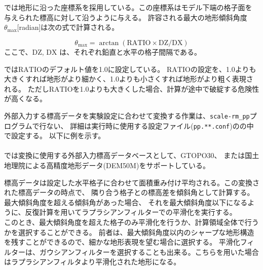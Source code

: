 \section{\SecBasicTopoSetting} \label{subsec:basic_usel_topo}

\scalerm では地形に沿った座標系を採用している。この座標系はモデル下端の格子面を
与えられた標高に対して沿うように与える。
許容される最大の地形傾斜角度$\theta_{\max}$[radian]は次の式で計算される。

\[ \theta_{\max} = \arctan( \mathrm{RATIO} \times \mathrm{DZ}/\mathrm{DX} ) \]
ここで、$\mathrm{DZ}$, $\mathrm{DX}$ は、それぞれ鉛直と水平の格子間隔である。

\scalerm では$\mathrm{RATIO}$のデフォルト値を1.0に設定している。
$\mathrm{RATIO}$の設定を、1.0よりも大きくすれば地形がより細かく、1.0よりも小さくすれば地形がより粗く表現される。
ただし$\mathrm{RATIO}$を1.0よりも大きくした場合、計算が途中で破綻する危険性が高くなる。

外部入力する標高データを実験設定に合わせて変換する作業は、\verb|scale-rm_pp|プログラムで行ない、
詳細は実行時に使用する設定ファイル(\verb|pp.**.conf|)のの中で設定する。
以下に例を示す。\\

\\

\scalerm では変換に使用する外部入力標高データベースとして、GTOPO30、
または国土地理院による高精度地形データ(DEM50M)をサポートしている。


標高データは設定した水平格子に合わせて面積重み付け平均される。この変換された標高データの時点で、
隣り合う格子との標高差を傾斜角として計算する。最大傾斜角度を超える傾斜角があった場合、
それを最大傾斜角度以下になるように、反復計算を用いてラプラシアンフィルターでの平滑化を実行する。\\
このとき、最大傾斜角度を超えた格子のみ平滑化を行うか、計算領域全体で行うかを選択することができる。
前者は、最大傾斜角度以内のシャープな地形構造を残すことができるので、細かな地形表現を望む場合に選択する。
平滑化フィルターは、ガウシアンフィルターを選択することも出来る。こちらを用いた場合はラプラシアンフィルタより平滑化された地形になる。


